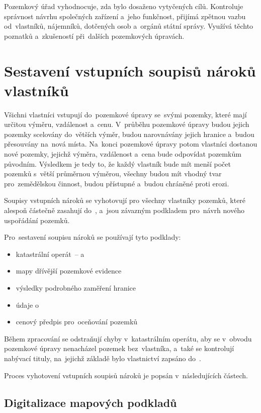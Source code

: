 Pozemkový úřad vyhodnocuje, zda bylo dosaženo vytyčených cílů. Kontroluje správ\-nost návrhu společných zařízení a~jeho funkčnost, přijímá zpětnou vazbu od~vlastníků, nájemníků, dotčených osob a~orgánů státní správy. Využívá těchto poznatků a~zkušeností při~dalších pozemkových úpravách.

\section{Sestavení vstupních soupisů nároků vlastníků}
\label{naroky}

Všichni vlastníci vstupují do~pozemkové úpravy se~svými pozemky, které mají určitou výměru, vzdálenost a~cenu. V~průběhu pozemkové úpravy budou jejich pozemky scelovány do~větších výměr, budou narovnávány jejich hranice a~budou přesouvány na~nová místa. Na~konci pozemkové úpravy potom vlastníci dostanou nové pozemky, jejichž výměra, vzdálenost a~cena bude odpovídat pozemkům původním. Výsledkem je tedy to, že každý vlastník bude mít menší počet pozemků s~větší průměrnou výměrou, všechny budou mít vhodný tvar pro~zemědělskou činnost, budou přístupné a~budou chráněné proti erozi.

Soupisy vstupních nároků se vyhotovují pro všechny vlastníky pozemků, které alespoň částečně zasahují do~, a~jsou závazným podkladem pro~návrh nového uspořádání pozemků.

Pro~sestavení soupisu nároků se používají tyto podklady:
\vspace{-\topsep}
	\begin{itemize}[leftmargin=1.5cm, noitemsep]
		\item katastrální operát~–  a~
		\item mapy dřívější pozemkové evidence
		\item výsledky podrobného zaměření hranice 
		\item údaje o~
		\item cenový předpis pro~oceňování pozemků
	\end{itemize}

Během zpracování  se odstraňují chyby v~katastrálním operátu, aby se v~obvodu pozemkové úpravy nenacházel pozemek bez~vlastníka, a~také se kontrolují nabývací tituly, na~jejichž základě bylo vlastnictví zapsáno do~.

Proces vyhotovení vstupních soupisů nároků je popsán v~následujících částech.

\subsection{Digitalizace mapových podkladů}
\label{digitalizace}

